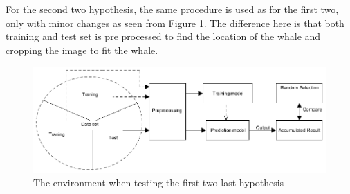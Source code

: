 For the second two hypothesis, the same procedure is used as for the first two, only with minor changes as seen from Figure \ref{fig:environmentPre}. The difference here is that both training and test set is pre processed to find the location of the whale and cropping the image to fit the whale.

\begin{figure}
\centering
\includegraphics[width=\linewidth]{Images/EnvironmentWithPre}
\caption{The environment when testing the first two last hypothesis}
\label{fig:environmentPre}
\end{figure}